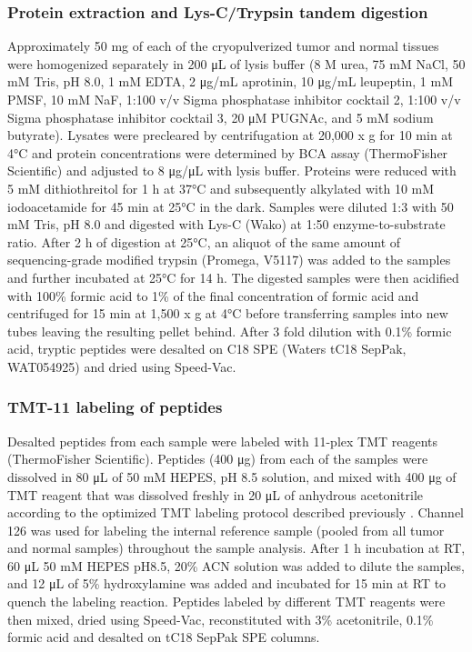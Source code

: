 \subsubsection{Protein extraction and Lys-C/Trypsin tandem digestion}
Approximately 50 mg of each of the cryopulverized tumor and normal tissues were homogenized separately in 200 μL of lysis buffer (8 M urea, 75 mM NaCl, 50 mM Tris, pH 8.0, 1 mM EDTA, 2 μg/mL aprotinin, 10 μg/mL leupeptin, 1 mM PMSF, 10 mM NaF, 1:100 v/v Sigma phosphatase inhibitor cocktail 2, 1:100 v/v Sigma phosphatase inhibitor cocktail 3, 20 μM PUGNAc, and 5 mM sodium butyrate). Lysates were precleared by centrifugation at 20,000 x g for 10 min at 4°C and protein concentrations were determined by BCA assay (ThermoFisher Scientific) and adjusted to 8 μg/μL with lysis buffer. Proteins were reduced with 5 mM dithiothreitol for 1 h at 37°C and subsequently alkylated with 10 mM iodoacetamide for 45 min at 25°C in the dark. Samples were diluted 1:3 with 50 mM Tris, pH 8.0 and digested with Lys-C (Wako) at 1:50 enzyme-to-substrate ratio. After 2 h of digestion at 25°C, an aliquot of the same amount of sequencing-grade modified trypsin (Promega, V5117) was added to the samples and further incubated at 25°C for 14 h. The digested samples were then acidified with 100\% formic acid to 1\% of the final concentration of formic acid and centrifuged for 15 min at 1,500 x g at 4°C before transferring samples into new tubes leaving the resulting pellet behind. After 3 fold dilution with 0.1\% formic acid, tryptic peptides were desalted on C18 SPE (Waters tC18 SepPak, WAT054925) and dried using Speed-Vac.

\subsubsection{TMT-11 labeling of peptides}
Desalted peptides from each sample were labeled with 11-plex TMT reagents (ThermoFisher Scientific). Peptides (400 μg) from each of the samples were dissolved in 80 μL of 50 mM HEPES, pH 8.5 solution, and mixed with 400 μg of TMT reagent that was dissolved freshly in 20 μL of anhydrous acetonitrile according to the optimized TMT labeling protocol described previously \cite{zechaj_kusterb:TMTLabeling2019}. Channel 126 was used for labeling the internal reference sample (pooled from all tumor and normal samples) throughout the sample analysis. After 1 h incubation at RT, 60 μL 50 mM HEPES pH8.5, 20\% ACN solution was added to dilute the samples, and 12 μL of 5\% hydroxylamine was added and incubated for 15 min at RT to quench the labeling reaction. Peptides labeled by different TMT reagents were then mixed, dried using Speed-Vac, reconstituted with 3\% acetonitrile, 0.1\% formic acid and desalted on tC18 SepPak SPE columns.


